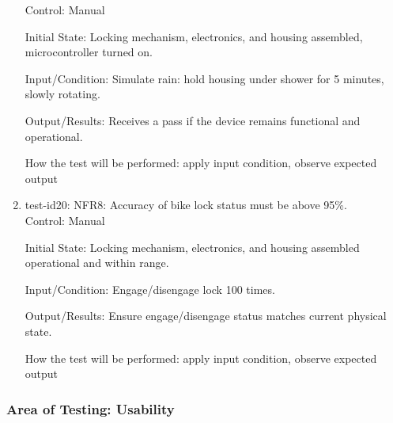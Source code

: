 \documentclass[12pt, titlepage]{article}
\begin{document}
\begin{enumerate}
Control: Manual 

Initial State: Locking mechanism, electronics, and housing assembled, microcontroller turned on.

Input/Condition: Simulate rain: hold housing under shower for 5 minutes, slowly rotating.

Output/Results: Receives a pass if the device remains functional and operational.

How the test will be performed: apply input condition, observe expected output

\item{test-id20: NFR8: Accuracy of bike lock status must be above 95\%. \\}
Control: Manual 

Initial State: Locking mechanism, electronics, and housing assembled operational and within range.

Input/Condition: Engage/disengage lock 100 times. 

Output/Results: Ensure engage/disengage status matches current physical state.

How the test will be performed: apply input condition, observe expected output
\end{enumerate}

\subsubsection{Area of Testing: Usability}
\end{document}
